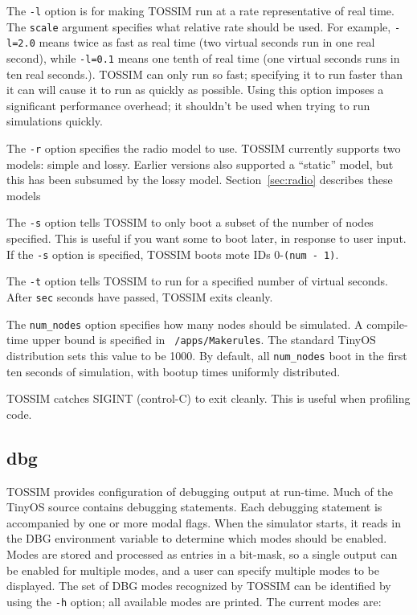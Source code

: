 \documentclass[10pt,fleqn]{article}
\def\sim{TOSSIM\xspace}
\begin{document}
The {\tt -l} option is for making \sim run at a rate representative of
real time. The {\tt scale} argument specifies what relative rate
should be used. For example, {\tt -l=2.0} means twice as fast as real
time (two virtual seconds run in one real second), while {\tt -l=0.1}
means one tenth of real time (one virtual seconds runs in ten real
seconds.). \sim can only run so fast; specifying it to run faster than
it can will cause it to run as quickly as possible. Using this option
imposes a significant performance overhead; it shouldn't be used when
trying to run simulations quickly.

The {\tt -r} option specifies the radio model to use. \sim currently
supports two models: simple and lossy. Earlier versions also supported
a ``static'' model, but this has been subsumed by the lossy
model. Section~\ref{sec:radio} describes these models

The {\tt -s} option tells \sim to only boot a subset of the number of
nodes specified. This is useful if you want some to boot later, in
response to user input. If the {\tt -s} option is specified, \sim
boots mote IDs 0-{\tt (num - 1)}.

The {\tt -t} option tells \sim to run for a specified number of
virtual seconds. After {\tt sec} seconds have passed, \sim exits cleanly.

The {\tt num\_nodes} option specifies how many nodes should be
simulated. A compile-time upper bound is specified in {\tt
/apps/Makerules}. The standard TinyOS distribution sets this value to
be 1000. By default, all {\tt num\_nodes} boot in the first ten
seconds of simulation, with bootup times uniformly distributed.

\sim catches SIGINT (control-C) to exit cleanly. This is useful when
profiling code.

\subsection{dbg}

\sim provides configuration of debugging output at run-time. Much of the
TinyOS source contains debugging statements. Each debugging statement
is accompanied by one or more modal flags. When the simulator starts,
it reads in the DBG environment variable to determine which modes
should be enabled. Modes are stored and processed as entries in a
bit-mask, so a single output can be enabled for multiple modes, and a
user can specify multiple modes to be displayed. The set of DBG modes
recognized by \sim can be identified by using the {\tt -h} option; all
available modes are printed. The current modes are:
\end{document}
